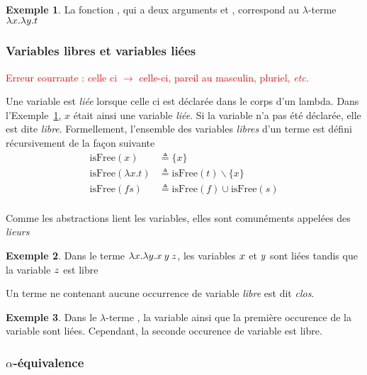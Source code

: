 \documentclass {article}
\theoremstyle{definition}
\newtheorem{example}{Exemple}
\theoremstyle{remark}
\newcommand{\todo}[1]{\textcolor{red}{#1}}
\newcommand{\etc}{\textit{etc.}}
\begin{document}
\begin{example}
  \label{example:id}
  La fonction , qui a deux arguments  et ,
  correspond au $\lambda$-terme $\lambda x. \lambda y. t$
\end{example} 


\subsubsection{Variables libres et variables liées}

\newcommand{\IsFree}{\mathrm{isFree}}

\todo{Erreur courrante : celle ci $\to$ celle-ci, pareil au masculin, pluriel, \etc}

Une variable est \emph{liée} lorsque celle ci est déclarée dans le corps d'un
lambda. Dans l'Exemple~\ref{example:id}, $x$ était ainsi une variable \emph{liée}.
Si la variable n'a pas été déclarée, elle est dite
\emph{libre}. Formellement, l'ensemble des variables \emph{libres} d'un terme est
défini récursivement de la façon suivante
%
\begin{align*}
  \IsFree(x) &\triangleq \{x\} \\
  \IsFree(\lambda x. t) &\triangleq \IsFree(t) \backslash \{x\} \\
  \IsFree(f s) &\triangleq \IsFree(f) \cup \IsFree(s) \\
\end{align*}

Comme les abstractions lient les variables, elles sont comunéments appelées des \emph{lieurs}

\begin{example}
  Dans le terme \(\lambda x. \lambda y. x\:y\:z\), 
  les variables $x$ et $y$ sont liées tandis que la variable $z$ est libre 
\end{example}


Un terme ne contenant aucune occurrence de variable \emph{libre} est dit \emph{clos}.

\begin{example}  
  \label{example:ouvert-clos}  
  Dans le $\lambda$-terme
  , la variable 
  ainsi que la première occurence de la variable  sont
  liées. Cependant, la seconde occurence de variable  est
  libre.
\end{example}


\subsubsection{$\alpha$-équivalence}
\label{alpha_equiv}
\label{problemelibreliee}
\end{document}
